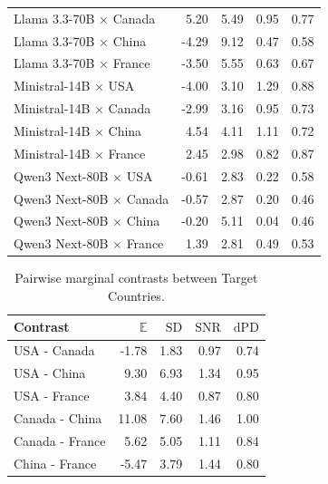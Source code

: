 \begin{table}[t]
\begin{center}
\begin{small}
\begin{sc}
\begin{tabular}{lrrll}
Llama 3.3-70B $\times$ Canada & 5.20 & 5.49 & 0.95 & 0.77 \\
Llama 3.3-70B $\times$ China & -4.29 & 9.12 & 0.47 & 0.58 \\
Llama 3.3-70B $\times$ France & -3.50 & 5.55 & 0.63 & 0.67 \\
\midrule
Ministral-14B $\times$ USA & -4.00 & 3.10 & 1.29 & 0.88 \\
Ministral-14B $\times$ Canada & -2.99 & 3.16 & 0.95 & 0.73 \\
Ministral-14B $\times$ China & 4.54 & 4.11 & 1.11 & 0.72 \\
Ministral-14B $\times$ France & 2.45 & 2.98 & 0.82 & 0.87 \\
\midrule
Qwen3 Next-80B $\times$ USA & -0.61 & 2.83 & 0.22 & 0.58 \\
Qwen3 Next-80B $\times$ Canada & -0.57 & 2.87 & 0.20 & 0.46 \\
Qwen3 Next-80B $\times$ China & -0.20 & 5.11 & 0.04 & 0.46 \\
Qwen3 Next-80B $\times$ France & 1.39 & 2.81 & 0.49 & 0.53 \\
\bottomrule
\end{tabular}
      \end{sc}
    \end{small}
  \end{center}
  \vskip -0.1in
\end{table}



\begin{table}[t]
  \caption{Pairwise marginal contrasts between Target Countries.}
  \label{tab:country-contrasts}
  \begin{center}
    \begin{small}
      \begin{sc}
\begin{tabular}{lrrrr}
\toprule
Contrast & $\mathbb{E}$ & $\mathrm{SD}$ & $\mathrm{SNR}$ & $\mathrm{dPD}$ \\
\midrule
USA - Canada & -1.78 & 1.83 & 0.97 & 0.74 \\
USA - China & 9.30 & 6.93 & 1.34 & 0.95 \\
USA - France & 3.84 & 4.40 & 0.87 & 0.80 \\
Canada - China & 11.08 & 7.60 & 1.46 & 1.00 \\
Canada - France & 5.62 & 5.05 & 1.11 & 0.84 \\
China - France & -5.47 & 3.79 & 1.44 & 0.80 \\
\bottomrule
\end{tabular}
      \end{sc}
    \end{small}
  \end{center}
  \vskip -0.1in
\end{table}


